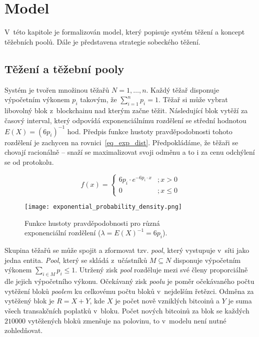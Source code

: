 
\section{Model}
\label{sec_model}

V~této kapitole je formalizován model, který popisuje systém těžení a koncept těžebních poolů. Dále je představena strategie sobeckého těžení.


\subsection{Těžení a těžební pooly}
\label{sec_model_mining_and_pools}

Systém je tvořen množinou těžařů $N = 1, \dots, n$. Každý těžař disponuje výpočetním výkonem $p_i$ takovým, že $\sum^n_{i=1} p_i = 1$. Těžař si může vybrat libovolný blok z~blockchainu nad kterým začne těžit. Následující blok vytěží za časový interval, který odpovídá exponenciálnímu rozdělení se střední hodnotou $E(X) = (6 p_i)^{-1}$ hod. Předpis funkce hustoty pravděpodobnosti tohoto rozdělení je zachycen na rovnici~\ref{eq_exp_dist}. Předpokládáme, že těžaři se chovají racionálně -- snaží se maximalizovat svoji odměnu a to i za cenu odchýlení se od protokolu.

\begin{equation}
    f(x)=\left\{\begin{matrix}
        6 p_i \cdot e^{- 6 p_i \cdot x} &; x > 0 \\
        0 &; x \leq 0
    \end{matrix}\right.
    \label{eq_exp_dist}
\end{equation}

\begin{figure}[ht]
    \centering
    \texttt{[image: exponential\_probability\_density.png]}
    \caption{Funkce hustoty pravděpodobnosti pro různá \\
    exponenciální rozdělení ($\lambda = E(X)^{-1} = 6 p_i$).}
    \label{fig_exponential_probability_density}
\end{figure}

Skupina těžařů se může spojit a zformovat tzv. \textit{pool}, který vystupuje v~síti jako jedna entita. \textit{Pool}, který se skládá z~učástníků $M \subseteq N$ disponuje výpočetním výkonem $\sum_{i \in M} p_i \leq 1$. Utržený zisk \textit{pool} rozděluje mezi své členy proporciálně dle jejich výpočetního výkonu. Očekávaný zisk \textit{poolu} je poměr očekávaného počtu vytěžení bloků \textit{poolem} ku celkovému počtu bloků v~nejdelším řetězci. Odměna za vytěžený blok je $R = X + Y$, kde $X$ je počet nově vzniklých bitcoinů a $Y$ je suma všech transakčních poplatků v~bloku. Počet nových bitcoinů za blok se každých $210 000$ vytěžených bloků zmenšuje na polovinu, to v~modelu není nutné zohledňovat.

